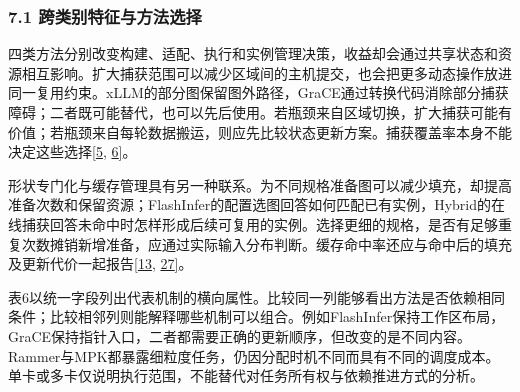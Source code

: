 \documentclass[UTF8,11pt,fontset=windows]{ctexart}
\begin{document}
\hypertarget{section-7-1}{%
\subsubsection{7.1 跨类别特征与方法选择}\label{section-7-1}}

四类方法分别改变构建、适配、执行和实例管理决策，收益却会通过共享状态和资源相互影响。扩大捕获范围可以减少区域间的主机提交，也会把更多动态操作放进同一复用约束。xLLM的部分图保留图外路径，GraCE通过转换代码消除部分捕获障碍；二者既可能替代，也可以先后使用。若瓶颈来自区域切换，扩大捕获可能有价值；若瓶颈来自每轮数据搬运，则应先比较状态更新方案。捕获覆盖率本身不能决定这些选择\protect\hyperlink{ref-5}{{[}5}, \protect\hyperlink{ref-6}{6{]}}。

形状专门化与缓存管理具有另一种联系。为不同规格准备图可以减少填充，却提高准备次数和保留资源；FlashInfer的配置选图回答如何匹配已有实例，Hybrid的在线捕获回答未命中时怎样形成后续可复用的实例。选择更细的规格，是否有足够重复次数摊销新增准备，应通过实际输入分布判断。缓存命中率还应与命中后的填充及更新代价一起报告\protect\hyperlink{ref-13}{{[}13}, \protect\hyperlink{ref-27}{27{]}}。

表6以统一字段列出代表机制的横向属性。比较同一列能够看出方法是否依赖相同条件；比较相邻列则能解释哪些机制可以组合。例如FlashInfer保持工作区布局，GraCE保持指针入口，二者都需要正确的更新顺序，但改变的是不同内容。Rammer与MPK都暴露细粒度任务，仍因分配时机不同而具有不同的调度成本。单卡或多卡仅说明执行范围，不能替代对任务所有权与依赖推进方式的分析。
\end{document}
